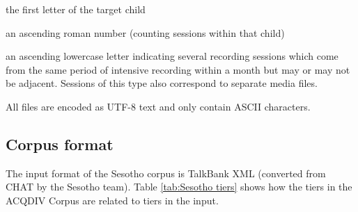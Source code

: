 \documentclass[a4paper, 11pt]{book}
\begin{document}
\begin{itemize*}
	\item the first letter of the target child
	\item an ascending roman number (counting sessions within that child)
	\item an ascending lowercase letter indicating several recording sessions which come from the same period of intensive recording 
		 within a month but may or may not be adjacent. Sessions of this type also correspond to separate media files. 
\end{itemize*}

All files are encoded as UTF-8 text and only contain ASCII characters. 


\subsection{Corpus format}

The input format of the Sesotho corpus is TalkBank XML (converted from CHAT by the Sesotho team). Table \autoref{tab:Sesotho tiers} shows how the tiers in the ACQDIV Corpus are related to tiers in the input.
\end{document}
